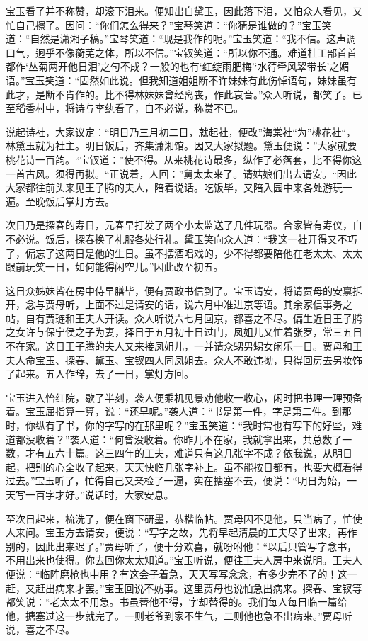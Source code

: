 \documentclass[12pt,oneside]{book}
\begin{document}
宝玉看了并不称赞，却滚下泪来。便知出自黛玉，因此落下泪，又怕众人看见，又忙自己擦了。因问：“你们怎么得来？”宝琴笑道：“你猜是谁做的？”宝玉笑道：“自然是潇湘子稿。”宝琴笑道：“现是我作的呢。”宝玉笑道：“我不信。这声调口气，迥乎不像蘅芜之体，所以不信。”宝钗笑道：“所以你不通。难道杜工部首首都作‘丛菊两开他日泪’之句不成？一般的也有‘红绽雨肥梅’‘水荇牵风翠带长’之媚语。”宝玉笑道：“固然如此说。但我知道姐姐断不许妹妹有此伤悼语句，妹妹虽有此才，是断不肯作的。比不得林妹妹曾经离丧，作此哀音。”众人听说，都笑了。已至稻香村中，将诗与李纨看了，自不必说，称赏不已。

说起诗社，大家议定：“明日乃三月初二日，就起社，便改”海棠社“为”桃花社“，林黛玉就为社主。明日饭后，齐集潇湘馆。因又大家拟题。黛玉便说：”大家就要桃花诗一百韵。“宝钗道：”使不得。从来桃花诗最多，纵作了必落套，比不得你这一首古风。须得再拟。“正说着，人回：”舅太太来了。请姑娘们出去请安。“因此大家都往前头来见王子腾的夫人，陪着说话。吃饭毕，又陪入园中来各处游玩一遍。至晚饭后掌灯方去。

次日乃是探春的寿日，元春早打发了两个小太监送了几件玩器。合家皆有寿仪，自不必说。饭后，探春换了礼服各处行礼。黛玉笑向众人道：“我这一社开得又不巧了，偏忘了这两日是他的生日。虽不摆酒唱戏的，少不得都要陪他在老太太、太太跟前玩笑一日，如何能得闲空儿。”因此改至初五。

这日众姊妹皆在房中侍早膳毕，便有贾政书信到了。宝玉请安，将请贾母的安禀拆开，念与贾母听，上面不过是请安的话，说六月中准进京等语。其余家信事务之帖，自有贾琏和王夫人开读。众人听说六七月回京，都喜之不尽。偏生近日王子腾之女许与保宁侯之子为妻，择日于五月初十日过门，凤姐儿又忙着张罗，常三五日不在家。这日王子腾的夫人又来接凤姐儿，一并请众甥男甥女闲乐一日。贾母和王夫人命宝玉、探春、黛玉、宝钗四人同凤姐去。众人不敢违拗，只得回房去另妆饰了起来。五人作辞，去了一日，掌灯方回。

宝玉进入怡红院，歇了半刻，袭人便乘机见景劝他收一收心，闲时把书理一理预备着。宝玉屈指算一算，说：“还早呢。”袭人道：“书是第一件，字是第二件。到那时，你纵有了书，你的字写的在那里呢？”宝玉笑道：“我时常也有写下的好些，难道都没收着？”袭人道：“何曾没收着。你昨儿不在家，我就拿出来，共总数了一数，才有五六十篇。这三四年的工夫，难道只有这几张字不成？依我说，从明日起，把别的心全收了起来，天天快临几张字补上。虽不能按日都有，也要大概看得过去。”宝玉听了，忙得自己又亲检了一遍，实在搪塞不去，便说：“明日为始，一天写一百字才好。”说话时，大家安息。

至次日起来，梳洗了，便在窗下研墨，恭楷临帖。贾母因不见他，只当病了，忙使人来问。宝玉方去请安，便说：“写字之故，先将早起清晨的工夫尽了出来，再作别的，因此出来迟了。”贾母听了，便十分欢喜，就吩咐他：“以后只管写字念书，不用出来也使得。你去回你太太知道。”宝玉听说，便往王夫人房中来说明。王夫人便说：“临阵磨枪也中用？有这会子着急，天天写写念念，有多少完不了的！这一赶，又赶出病来才罢。”宝玉回说不妨事。这里贾母也说怕急出病来。探春、宝钗等都笑说：“老太太不用急。书虽替他不得，字却替得的。我们每人每日临一篇给他，搪塞过这一步就完了。一则老爷到家不生气，二则他也急不出病来。”贾母听说，喜之不尽。
\end{document}

